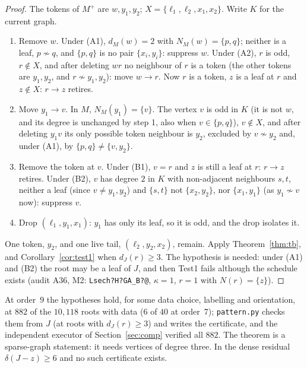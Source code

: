 \documentclass[11pt]{amsart}
\theoremstyle{definition}
\begin{document}
\begin{proof}
The tokens of $M^+$ are $w,y_1,y_2$; $X=\{\ell_1,\ell_2,x_1,x_2\}$. Write $K$ for the current graph.
\begin{enumerate}
\item Remove $w$. Under (A1), $d_M(w)=2$ with $N_M(w)=\{p,q\}$; neither is a leaf, $p\not\sim q$,
and $\{p,q\}$ is no pair $\{x_i,y_i\}$: suppress $w$. Under (A2), $r$ is odd, $r\notin X$, and after
deleting $wr$ no neighbour of $r$ is a token (the other tokens are $y_1,y_2$, and $r\not\sim
y_1,y_2$): move $w\to r$. Now $r$ is a token, $z$ is a leaf at $r$ and $z\notin X$: $r\to z$
retires.
\item Move $y_1\to v$. In $M$, $N_M(y_1)=\{v\}$. The vertex $v$ is odd in $K$ (it is not $w$, and
its degree is unchanged by step 1, also when $v\in\{p,q\}$), $v\notin X$, and after deleting $y_1v$
its only possible token neighbour is $y_2$, excluded by $v\not\sim y_2$ and, under (A1), by
$\{p,q\}\ne\{v,y_2\}$.
\item Remove the token at $v$. Under (B1), $v=r$ and $z$ is still a leaf at $r$: $r\to z$ retires.
Under (B2), $v$ has degree $2$ in $K$ with non-adjacent neighbours $s,t$, neither a leaf (since $v\ne
y_1,y_2$) and $\{s,t\}$ not $\{x_2,y_2\}$, nor $\{x_1,y_1\}$ (as $y_1\not\sim v$ now): suppress
$v$.
\item Drop $(\ell_1,y_1,x_1)$: $y_1$ has only its leaf, so it is odd, and the drop isolates it.
\end{enumerate}
One token, $y_2$, and one live tail, $(\ell_2,y_2,x_2)$, remain. Apply Theorem~\ref{thm:tb}, and
Corollary~\ref{cor:test1} when $d_J(r)\ge3$. The hypothesis is needed: under (A1) and (B2) the root
may be a leaf of $J$, and then Test1 fails although the schedule exists (audit A36, M2:
\texttt{Lsech?H?GA\_B?@}, $\kappa=1$, $r=1$ with $N(r)=\{z\}$).
\end{proof}

At order~$9$ the hypotheses hold, for some data choice, labelling and orientation, at $882$ of the
$10{,}118$ roots with data ($6$ of $40$ at order~$7$); \texttt{pattern.py} checks them from $J$ (at roots
with $d_J(r)\ge3$) and writes the certificate, and the independent executor of Section~\ref{sec:comp} verified all $882$.
The theorem is a sparse-graph statement: it needs vertices of degree three. In the dense residual
$\delta(J-z)\ge6$ and no such certificate exists.
\end{document}
